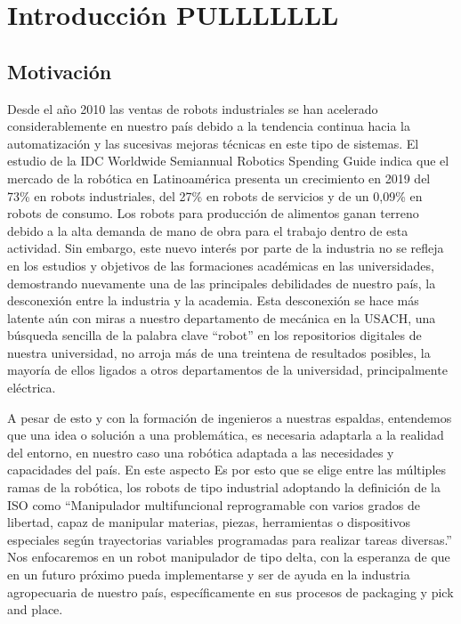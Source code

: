 \chapter{Introducción PULLLLLLL}\label{CAP1}

\section{Motivación}

Desde el año 2010 las ventas de robots industriales se han acelerado considerablemente en nuestro país debido a la tendencia continua hacia la automatización y las sucesivas mejoras técnicas en este tipo de sistemas. El estudio de la IDC Worldwide Semiannual Robotics Spending Guide indica que el mercado de la robótica en Latinoamérica presenta un crecimiento en 2019 del 73\% en robots industriales, del 27\% en robots de servicios y de un 0,09\% en robots de consumo. Los robots para producción de alimentos ganan terreno debido a la alta demanda de mano de obra para el trabajo dentro de esta actividad. Sin embargo, este nuevo interés por parte de la industria no se refleja en los estudios y objetivos de las formaciones académicas en las universidades, demostrando nuevamente una de las principales debilidades de nuestro país, la desconexión entre la industria y la academia. Esta desconexión se hace más latente aún con miras a nuestro departamento de mecánica en la USACH, una búsqueda sencilla de la palabra clave “robot” en los repositorios digitales de nuestra universidad, no arroja más de una treintena de resultados posibles, la mayoría de ellos ligados a otros departamentos de la universidad, principalmente eléctrica.

A pesar de esto y con la formación de ingenieros a nuestras espaldas, entendemos que una idea o solución a una problemática, es necesaria adaptarla a la realidad del entorno, en nuestro caso una robótica adaptada a las necesidades y capacidades del país. En este aspecto   Es por esto que se elige entre las múltiples ramas de la robótica, los robots de tipo industrial adoptando la definición de la ISO como “Manipulador multifuncional reprogramable con varios grados de libertad, capaz de manipular materias, piezas, herramientas o dispositivos especiales según trayectorias variables programadas para realizar tareas diversas.” Nos enfocaremos en un robot manipulador de tipo delta, con la esperanza de que en un futuro próximo pueda implementarse y ser de ayuda en la industria agropecuaria de nuestro país, específicamente en sus procesos de packaging y pick and place.

